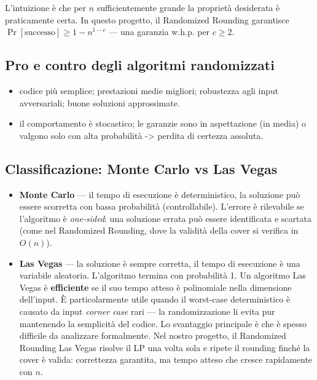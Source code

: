 \documentclass[12pt, a4paper]{article}
\begin{document}
L'intuizione è che per $n$ sufficientemente grande la proprietà desiderata è 
praticamente certa. In questo progetto, il Randomized Rounding garantisce 
$\Pr[\text{successo}] \geq 1 - n^{1-c}$ — una garanzia w.h.p. per $c \geq 2$.

\subsection*{Pro e contro degli algoritmi randomizzati}

\begin{itemize}
    \item[\textbf{Pro:}] codice più semplice; prestazioni medie migliori; 
    robustezza agli input avversariali; buone soluzioni approssimate.
    
    \item[\textbf{Contro:}] il comportamento è stocastico; le garanzie sono 
    in aspettazione (in media) o valgono solo con alta probabilità -> perdita di certezza assoluta.
\end{itemize}

\subsection*{Classificazione: Monte Carlo vs Las Vegas}

\begin{itemize}
    \item \textbf{Monte Carlo} — il tempo di esecuzione è deterministico, 
    la soluzione può essere scorretta con bassa probabilità (controllabile). 
    L'errore è rilevabile se l'algoritmo è \textit{one-sided}: una soluzione errata può essere identificata e scartata 
    (come nel Randomized Rounding, dove la validità della cover si verifica in $O(n)$).

    \item \textbf{Las Vegas} — la soluzione è sempre corretta, 
    il tempo di esecuzione è una variabile aleatoria. 
    L'algoritmo termina con probabilità 1. 
    Un algoritmo Las Vegas è \textbf{efficiente} se il suo tempo atteso 
    è polinomiale nella dimensione dell'input.
    È particolarmente utile quando il worst-case deterministico è causato 
    da input \textit{corner case} rari — la randomizzazione li evita 
    pur mantenendo la semplicità del codice.
    Lo svantaggio principale è che è spesso difficile da analizzare formalmente.
    Nel nostro progetto, il Randomized Rounding Las Vegas risolve il LP una 
    volta sola e ripete il rounding finché la cover è valida: 
    correttezza garantita, ma tempo atteso che cresce rapidamente con $n$.
\end{itemize}
\end{document}
